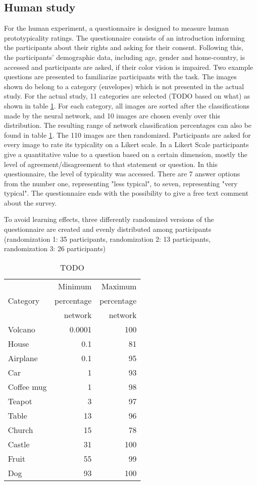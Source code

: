 \documentclass[10pt,a4paper,twocolumn]{article}
\begin{document}
\subsection*{Human study}
For the human experiment, a questionnaire is designed to measure human prototypicality ratings. The questionnaire consists of an introduction informing the participants about their rights and asking for their consent. Following this, the participants' demographic data, including age, gender and home-country, is accessed and participants are asked, if their color vision is impaired. Two example questions are presented to familiarize participants with the task. The images shown do belong to a category (envelopes) which is not presented in the actual study. For the actual study, 11 categories are selected (TODO based on what) as shown in table \ref{tab:cat_per}. For each category, all images are sorted after the classifications made by the neural network, and 10 images are chosen evenly over this distribution. The resulting range of network classification percentages can also be found in table \ref{tab:cat_per}. The 110 images are then randomized. Participants are asked for every image to rate its typicality on a Likert scale. In a Likert Scale participants give a quantitative value to a question based on a certain dimension, mostly the level of agreement/disagreement to that statement or question. In this questionnaire, the level of typicality was accessed. There are 7 answer options from the number one, representing "less typical", to seven, representing "very typical". The questionnaire ends with the possibility to give a free text comment about the survey.

To avoid learning effects, three differently randomized versions of the questionnaire are created and evenly distributed among participants (randomization 1: 35 participants, randomization 2: 13 participants, randomization 3: 26 participants) 
\begin{table}[ht]
\begin{center}
\begin{tabular}{l r r}
\multirow{3}{*}{Category} & Minimum & Maximum \\
 & percentage &  percentage \\
 & network & network \\
\hline
Volcano & 0.0001 & 100 \\
House & 0.1\hphantom{001} & 81\\
Airplane & 0.1\hphantom{001} & 95 \\
Car & 1\hphantom{.0001} & 93 \\
Coffee mug & 1\hphantom{.0001} & 98 \\
Teapot & 3\hphantom{.0001} & 97 \\
Table & 13\hphantom{.0001} & 96 \\
Church & 15\hphantom{.0001} & 78 \\
Castle & 31\hphantom{.0001} & 100 \\
Fruit & 55\hphantom{.0001} & 99 \\
Dog & 93\hphantom{.0001} & 100
\end{tabular}
\end{center}
\caption{TODO}
\label{tab:cat_per}
\end{table}
\end{document}

